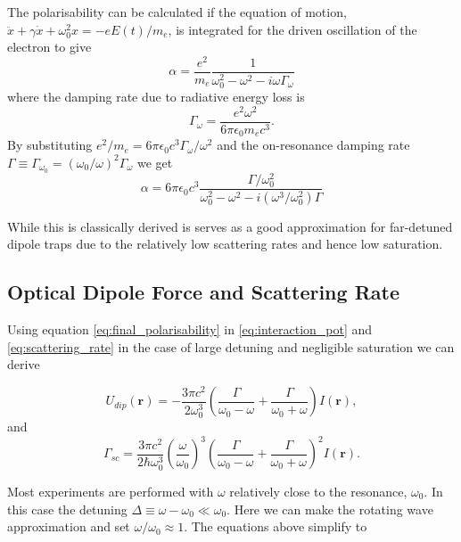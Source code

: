 The polarisability can be calculated if the equation of motion, $\ddot{x} + \gamma \dot{x} + \omega_0^2 x = -eE(t)/m_e$, is integrated for the driven oscillation of the electron to give
\begin{equation} \label{eq:polarisability}
\alpha = \frac{e^2}{m_e} \frac{1}{\omega_0^2-\omega^2-i\omega\Gamma_\omega}
\end{equation}
where the damping rate due to radiative energy loss is
\begin{equation}\label{eq:damping_rate}
\Gamma_\omega=\frac{e^2\omega^2}{6\pi\epsilon_0m_ec^3}.
\end{equation}
By substituting $e^2/m_e=6\pi\epsilon_0 c^3\Gamma_\omega / \omega^2$ and the on-resonance damping rate $\Gamma \equiv \Gamma_{\omega_0} = (\omega_0/\omega)^2\Gamma_\omega$ we get
\begin{equation}\label{eq:final_polarisability}
\alpha = 6\pi \epsilon_0 c^3 \frac{\Gamma/\omega_0^2}{\omega_0^2 - \omega^2 - i(\omega^3/\omega_0^2)\Gamma}
\end{equation}

While this is classically derived is serves as a good approximation for far-detuned dipole traps due to the relatively low scattering rates and hence low saturation\cite{grimm_optical_2000}.

\subsection{Optical Dipole Force and Scattering Rate}

Using equation \ref{eq:final_polarisability} in \ref{eq:interaction_pot} and \ref{eq:scattering_rate} in the case of large detuning and negligible saturation we can derive

\begin{equation}\label{eq:potential}
U_{dip}(\boldsymbol r) = -\frac{3\pi c^2}{2\omega_0^3}\left(\frac{\Gamma}{\omega_0-\omega} + \frac{\Gamma}{\omega_0+\omega}\right) I(\boldsymbol r),
\end{equation}
and
\begin{equation}\label{eq:scattering}
\Gamma_{sc} = \frac{3\pi c^2}{2\hbar\omega_0^3} \left(\frac{\omega}{\omega_0}\right)^3 \left(\frac{\Gamma}{\omega_0 - \omega} + \frac{\Gamma}{\omega_0+\omega}\right)^2 I(\boldsymbol r).
\end{equation}

Most experiments are performed with $\omega$ relatively close to the resonance, $\omega_0$. In this case the detuning $\Delta\equiv \omega - \omega_0 \ll \omega_0$. Here we can make the rotating wave approximation and set $\omega/\omega_0\approx 1$. The equations above simplify to

